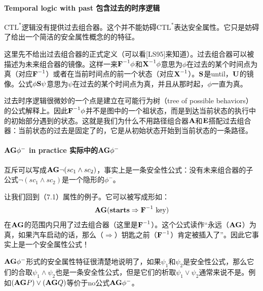 \documentclass{book}
\begin{document}
    \paragraph{Temporal logic with past 包含过去的时序逻辑} $\text{CTL}^*$逻辑没有提供过去组合器。这个并不能妨碍$\text{CTL}^*$表达安全属性。它只是妨碍了给出一个简洁的安全属性概念的的特征。

    这里先不给出过去组合器的正式定义（可以看[LS95]来知道）。过去组合器可以被描述为未来组合器的镜像。这样一来$\text{\textbf{F}}^{-1}\phi$和$\text{\textbf{X}}^{-1}\phi$意思为$\phi$在过去的某个时间点为真（对应$ \text{\textbf{F}}^{-1}$）或者在当前时间点的前一个状态（对应$\text{\textbf{X}}^{-1}$）。$\text{\textbf{S}}$是until，$\text{\textbf{U}}$的镜像。公式$\phi\text{\textbf{S}}\psi$意思为$\psi$在过去的某个时间点为真，并且从那时起，$\phi$一直为真。

    过去时序逻辑很微妙的一个点是建立在可能行为树（tree of possible behaviors）的公式解释上。因此$\text{\textbf{F}}^{-1}\phi$并不是图中的一个祖状态，而是到达当前状态的执行中的初始部分遇到的状态。这就是我们为什么不用路径组合器$\text{\textbf{A}}$和$\text{\textbf{E}}$搭配过去组合器：当前状态的过去是固定了的，它是从初始状态开始到当前状态的一条路径。

    \paragraph{$\text{\textbf{AG}}\phi^-$ in practice 实际中的$\text{\textbf{AG}}\phi^-$} 互斥可以写成$\text{\textbf{AG}}\neg(sc_1\wedge sc_2)$，事实上是一条安全性公式：没有未来组合器的子公式$\neg(sc_1\wedge sc_2)$是一个隐形的$\phi^-$。

    让我们回到（7.1）属性的例子。它可以被写成形如：
    \begin{equation}\label{}
      \text{\textbf{AG}}(\text{\textbf{starts}}\Rightarrow \text{\textbf{F}}^{-1} \text{ key} )
    \end{equation}
    在$\text{\textbf{AG}}$的范围内只用了过去组合器（这里是$\text{\textbf{F}}^{-1}$）。这个公式读作“永远（$\text{\textbf{AG}}$）为真，如果汽车启动的话，那么（$\Rightarrow$）钥匙之前（$\text{\textbf{F}}^{-1}$）肯定被插入了”。因此它事实上是一个安全属性公式！

    $\text{\textbf{AG}}\phi^-$形式的安全属性特征很清楚地说明了，如果$\psi_1$和$\psi_2$是安全性公式，那么它们的合取$\psi_1\wedge\psi_2$也是一条安全性公式，但是它们的析取$\psi_1\vee\psi_2$通常来说不是。例如$(\text{\textbf{AG}}P)\vee(\text{\textbf{AG}}Q)$等价于no公式$\text{\textbf{AG}}\phi^-$。
\end{document}
